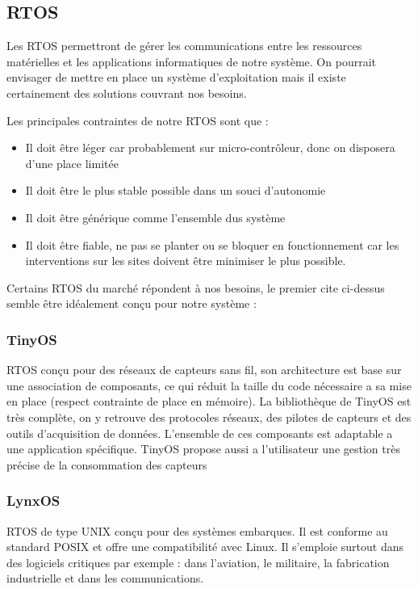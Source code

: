 \documentclass{article}
\begin{document}
\subsection{RTOS}
		Les RTOS permettront de gérer les communications entre les ressources matérielles et les applications informatiques de notre système. On pourrait envisager de mettre en place un système d'exploitation mais il existe certainement des solutions couvrant nos besoins.
		
		Les principales contraintes de notre RTOS sont que :
		\begin{itemize}
				\item Il doit être léger car probablement sur micro-contrôleur, donc on disposera d'une place limitée
				\item Il doit être le plus stable possible dans un souci d'autonomie
				\item Il doit être générique comme l'ensemble dus système
				\item Il doit être fiable, ne pas se planter ou se bloquer en fonctionnement car les interventions sur les sites doivent être minimiser le plus possible.
		\end{itemize}

		Certains RTOS du marché répondent à nos besoins, le premier cite ci-dessus semble être idéalement conçu pour notre système :
		
		\subsubsection{TinyOS}
		RTOS conçu pour des réseaux de capteurs sans fil, son architecture est base sur une association de composants, ce qui réduit la taille du code nécessaire a sa mise en place (respect contrainte de place en mémoire). La bibliothèque de TinyOS est très complète, on y retrouve des protocoles réseaux, des pilotes de capteurs et des outils d'acquisition de données. L'ensemble de ces composants est adaptable a une application spécifique. TinyOS propose aussi a l'utilisateur une gestion très précise de la consommation des capteurs

		\subsubsection{LynxOS}
		RTOS de type UNIX conçu pour des systèmes embarques. Il est conforme au standard POSIX et offre une compatibilité avec Linux. Il s'emploie surtout dans des logiciels critiques par exemple : dans l'aviation, le militaire, la fabrication industrielle et dans les communications.
\end{document}
